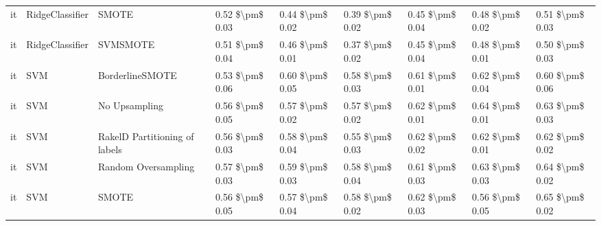 \begin{tabular}{lllllllll}
      it &                 RidgeClassifier &                         SMOTE &     0.52 \$\textbackslash pm\$ 0.03 &           0.44 \$\textbackslash pm\$ 0.02 &       0.39 \$\textbackslash pm\$ 0.02 &        0.45 \$\textbackslash pm\$ 0.04 &                         0.48 \$\textbackslash pm\$ 0.02 &     0.51 \$\textbackslash pm\$ 0.03 \\
      it &                 RidgeClassifier &                      SVMSMOTE &     0.51 \$\textbackslash pm\$ 0.04 &           0.46 \$\textbackslash pm\$ 0.01 &       0.37 \$\textbackslash pm\$ 0.02 &        0.45 \$\textbackslash pm\$ 0.04 &                         0.48 \$\textbackslash pm\$ 0.01 &     0.50 \$\textbackslash pm\$ 0.03 \\
      it &                             SVM &               BorderlineSMOTE &     0.53 \$\textbackslash pm\$ 0.06 &           0.60 \$\textbackslash pm\$ 0.05 &       0.58 \$\textbackslash pm\$ 0.03 &        0.61 \$\textbackslash pm\$ 0.01 &                         0.62 \$\textbackslash pm\$ 0.04 &     0.60 \$\textbackslash pm\$ 0.06 \\
      it &                             SVM &                 No Upsampling &     0.56 \$\textbackslash pm\$ 0.05 &           0.57 \$\textbackslash pm\$ 0.02 &       0.57 \$\textbackslash pm\$ 0.02 &        0.62 \$\textbackslash pm\$ 0.01 &                         0.64 \$\textbackslash pm\$ 0.01 &     0.63 \$\textbackslash pm\$ 0.03 \\
      it &                             SVM & RakelD Partitioning of labels &     0.56 \$\textbackslash pm\$ 0.03 &           0.58 \$\textbackslash pm\$ 0.04 &       0.55 \$\textbackslash pm\$ 0.03 &        0.62 \$\textbackslash pm\$ 0.02 &                         0.62 \$\textbackslash pm\$ 0.01 &     0.62 \$\textbackslash pm\$ 0.02 \\
      it &                             SVM &           Random Oversampling &     0.57 \$\textbackslash pm\$ 0.03 &           0.59 \$\textbackslash pm\$ 0.03 &       0.58 \$\textbackslash pm\$ 0.04 &        0.61 \$\textbackslash pm\$ 0.03 &                         0.63 \$\textbackslash pm\$ 0.03 &     0.64 \$\textbackslash pm\$ 0.02 \\
      it &                             SVM &                         SMOTE &     0.56 \$\textbackslash pm\$ 0.05 &           0.57 \$\textbackslash pm\$ 0.04 &       0.58 \$\textbackslash pm\$ 0.02 &        0.62 \$\textbackslash pm\$ 0.03 &                         0.56 \$\textbackslash pm\$ 0.05 &     0.65 \$\textbackslash pm\$ 0.02 \\

\end{tabular}
